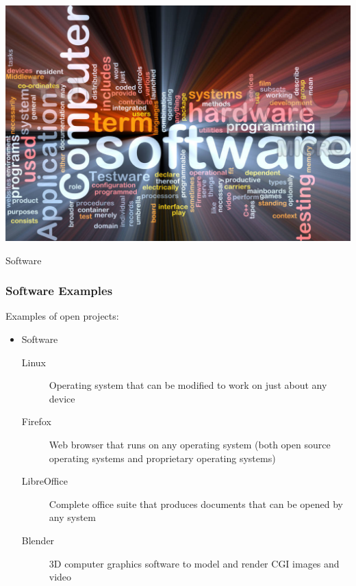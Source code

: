 \documentclass{beamer}
\begin{document}
\begin{frame}
  \begin{center} 
    \includegraphics[width=1\textwidth]{../img/software-words-3}
    \begin{Huge} Software \end{Huge} 
  \end{center}
\end{frame}

\begin{frame}
  \frametitle{Software Examples}
  Examples of open projects:

  \begin{itemize}
  \item Software
    \begin{description}
    \item[Linux] Operating system that can be modified to work on just
      about any device
    \item[Firefox] Web browser that runs on any operating system (both
      open source operating systems and proprietary operating systems)
    \item[LibreOffice] Complete office suite that produces documents
      that can be opened by any system
    \item[Blender] 3D computer graphics software to model and render CGI images and video
    \end{description}
    \end{itemize}
\end{frame}
\end{document}
